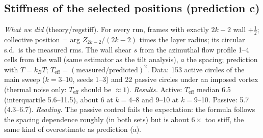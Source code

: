 \documentclass[11pt,a4paper]{article}
\newcommand{\kT}{k_BT}\newcommand{\half}{\tfrac12}\newcommand{\la}{\ell_a}
\begin{document}
\subsection{Stiffness of the selected positions (prediction c)}
\emph{What we did} (theory/regstiff). For every run, frames with exactly $2k-2$ wall $+\half$; collective position = arg $Z_{2k-2}/(2k-2)$ times the layer
radius; its circular s.d.\ is the measured rms. The wall shear $s$ from the azimuthal flow profile 1--4 cells from the wall (same estimator as the tilt
analysis), $a$ the spacing; prediction with $T=\kT$; $T_\mathrm{eff}=(\text{measured}/\text{predicted})^2$. Data: 153 active circles of the main sweep ($k=3$--10, seeds 1--3)
and 22 passive circles under an imposed vortex (thermal noise only: $T_\mathrm{eff}$ should be $\approx1$).
\emph{Results.} Active: $T_\mathrm{eff}$ median 6.5 (interquartile 5.6--11.5), about 6 at $k=4$--8 and 9--10 at $k=9$--10. Passive: 5.7 (4.3--6.7).
\emph{Reading.} The passive control fails the expectation: the formula follows the spacing dependence roughly (in both sets) but is about $6\times$ too stiff,
the same kind of overestimate as prediction (a).
\end{document}
